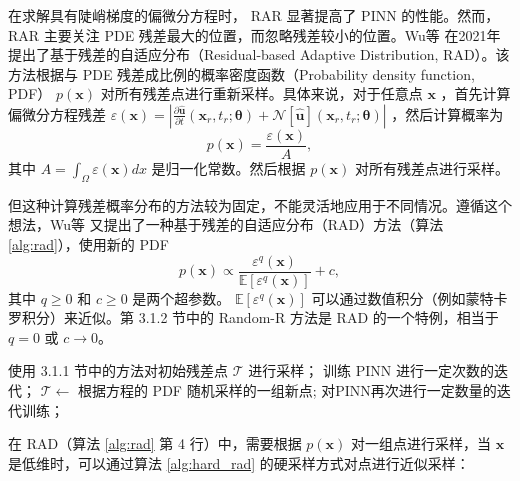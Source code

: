 在求解具有陡峭梯度的偏微分方程时， RAR 显著提高了 PINN 的性能。然而， RAR 主要关注 PDE 残差最大的位置，而忽略残差较小的位置。Wu等 \cite{wu2023comprehensive}在2021年提出了基于残差的自适应分布（Residual-based Adaptive Distribution, RAD）。该方法根据与 PDE 残差成比例的概率密度函数（Probability density function, PDF） $p(\mathbf{x})$ 对所有残差点进行重新采样。具体来说，对于任意点 $\mathbf{x}$ ，首先计算偏微分方程残差 $\varepsilon(\mathbf{x})=|\frac{\partial \boldsymbol{\hat{u}}}{\partial t}(\boldsymbol{x}_r,t_r;\boldsymbol{\theta})+\mathcal{N}[\boldsymbol{\hat{u}}](\boldsymbol{x}_r,t_r;\boldsymbol{\theta})|$ ，然后计算概率为
\begin{equation}p(\mathbf{x})=\frac{\varepsilon(\mathbf{x})}{A},\end{equation}
其中 $A=\int_\Omega\varepsilon(\mathbf{x})dx$ 是归一化常数。然后根据 $p(\mathbf{x})$ 对所有残差点进行采样。

但这种计算残差概率分布的方法较为固定，不能灵活地应用于不同情况。遵循这个想法，Wu等 \cite{wu2023comprehensive}又提出了一种基于残差的自适应分布（RAD）方法（算法 \ref{alg:rad}），使用新的 PDF
\begin{equation}p(\mathbf{x})\propto\frac{\varepsilon^q(\mathbf{x})}{\mathbb{E}[\varepsilon^q(\mathbf{x})]}+c,\end{equation}
其中 $q\geq0$ 和 $c\geq0$ 是两个超参数。 $\mathbb{E}[\varepsilon^q(\mathbf{x})]$ 可以通过数值积分（例如蒙特卡罗积分）来近似。第 3.1.2 节中的 Random-R 方法是 RAD 的一个特例，相当于 $q = 0$ 或 $c \rightarrow 0$。

\begin{algorithm}[h]
    \caption{基于残差的自适应分布(RAD)}
    \label{alg:rad}
    \begin{algorithmic}[1]
        \STATE 使用 3.1.1 节中的方法对初始残差点 $\mathcal{T}$ 进行采样；
        \STATE 训练 PINN 进行一定次数的迭代；
            \STATE $\mathcal{T} \leftarrow $ 根据方程的 PDF 随机采样的一组新点;
            \STATE 对PINN再次进行一定数量的迭代训练；
        \ENDFOR %
    \end{algorithmic}
\end{algorithm}

在 RAD（算法 \ref{alg:rad} 第 4 行）中，需要根据 $p(\mathbf{x})$ 对一组点进行采样，当 $\mathbf{x}$ 是低维时，可以通过算法 \ref{alg:hard_rad} 的硬采样方式对点进行近似采样：

